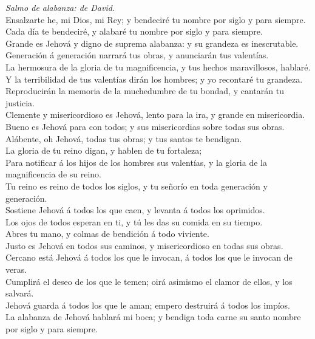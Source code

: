  \emph{Salmo de alabanza: de David.}\\
Ensalzarte he, mi Dios, mi Rey; y bendeciré tu nombre por siglo y para
siempre.\\
 Cada día te bendeciré, y alabaré tu nombre por siglo y para
siempre.\\
 Grande es Jehová y digno de suprema alabanza: y su grandeza
es inescrutable.\\
 Generación á generación narrará tus obras, y anunciarán tus
valentías.\\
 La hermosura de la gloria de tu magnificencia, y tus hechos
maravillosos, hablaré.\\
 Y la terribilidad de tus valentías dirán los hombres; y yo
recontaré tu grandeza.\\
 Reproducirán la memoria de la muchedumbre de tu bondad, y
cantarán tu justicia.\\
 Clemente y misericordioso es Jehová, lento para la ira, y
grande en misericordia.\\
 Bueno es Jehová para con todos; y sus misericordias sobre
todas sus obras.\\
 Alábente, oh Jehová, todas tus obras; y tus santos te
bendigan.\\
 La gloria de tu reino digan, y hablen de tu fortaleza;\\
 Para notificar á los hijos de los hombres sus valentías, y
la gloria de la magnificencia de su reino.\\
 Tu reino es reino de todos los siglos, y tu señorío en
toda generación y generación.\\
 Sostiene Jehová á todos los que caen, y levanta á todos
los oprimidos.\\
 Los ojos de todos esperan en ti, y tú les das su comida en
su tiempo.\\
 Abres tu mano, y colmas de bendición á todo viviente.\\
 Justo es Jehová en todos sus caminos, y misericordioso en
todas sus obras.\\
 Cercano está Jehová á todos los que le invocan, á todos
los que le invocan de veras.\\
 Cumplirá el deseo de los que le temen; oirá asimismo el
clamor de ellos, y los salvará.\\
 Jehová guarda á todos los que le aman; empero destruirá á
todos los impíos.\\
 La alabanza de Jehová hablará mi boca; y bendiga toda
carne su santo nombre por siglo y para siempre.

